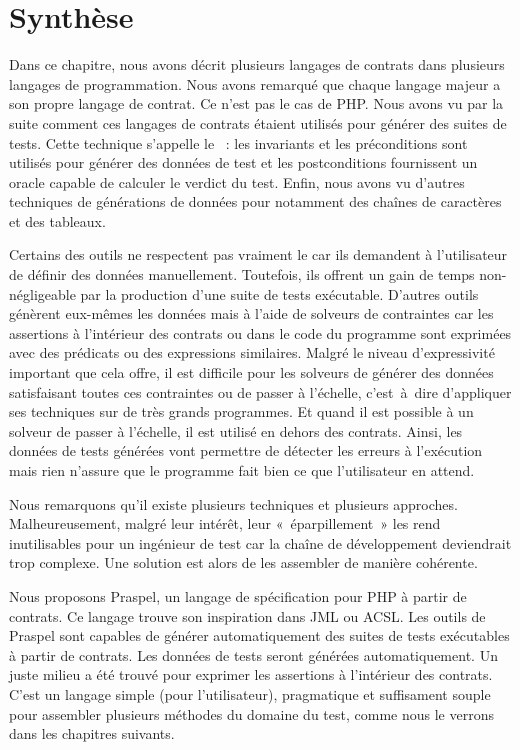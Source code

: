 \section{Synthèse}
\label{section:sota:summary}

Dans ce chapitre, nous avons décrit plusieurs langages de contrats dans
plusieurs langages de programmation. Nous avons remarqué que chaque langage
majeur a son propre langage de contrat. Ce n'est pas le cas de PHP. Nous avons
vu par la suite comment ces langages de contrats étaient utilisés pour générer
des suites de tests. Cette technique s'appelle le ~: les invariants et les préconditions sont utilisés pour générer des
données de test et les postconditions fournissent un oracle capable de calculer
le verdict du test. Enfin, nous avons vu d'autres techniques de générations de
données pour notamment des chaînes de caractères et des tableaux.

Certains des outils ne respectent pas vraiment le  car ils demandent à l'utilisateur de définir des données manuellement.
Toutefois, ils offrent un gain de temps non-négligeable par la production d'une
suite de tests exécutable. D'autres outils génèrent eux-mêmes les données mais à
l'aide de solveurs de contraintes car les assertions à l'intérieur des contrats
ou dans le code du programme sont exprimées avec des prédicats ou des
expressions similaires. Malgré le niveau d'expressivité important que cela
offre, il est difficile pour les solveurs de générer des données satisfaisant
toutes ces contraintes ou de passer à l'échelle, c'est~à~dire d'appliquer ses
techniques sur de très grands programmes. Et quand il est possible à un solveur
de passer à l'échelle, il est utilisé en dehors des contrats. Ainsi, les données
de tests générées vont permettre de détecter les erreurs à l'exécution mais rien
n'assure que le programme fait bien ce que l'utilisateur en attend.

Nous remarquons qu'il existe plusieurs techniques et plusieurs approches.
Malheureusement, malgré leur intérêt, leur «~éparpillement~» les rend
inutilisables pour un ingénieur de test car la chaîne de développement
deviendrait trop complexe. Une solution est alors de les assembler de manière
cohérente.

Nous proposons Praspel, un langage de spécification pour PHP à partir de
contrats. Ce langage trouve son inspiration dans JML ou ACSL. Les outils de
Praspel sont capables de générer automatiquement des suites de tests exécutables
à partir de contrats. Les données de tests seront générées automatiquement. Un
juste milieu a été trouvé pour exprimer les assertions à l'intérieur des
contrats. C'est un langage simple (pour l'utilisateur), pragmatique et
suffisament souple pour assembler plusieurs méthodes du domaine du test, comme
nous le verrons dans les chapitres suivants.
